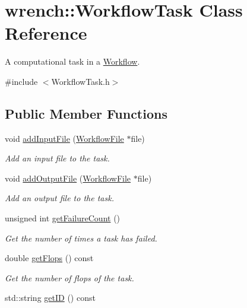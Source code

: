 \hypertarget{classwrench_1_1_workflow_task}{}\section{wrench\+:\+:Workflow\+Task Class Reference}
\label{classwrench_1_1_workflow_task}


A computational task in a \hyperlink{classwrench_1_1_workflow}{Workflow}.  




{\ttfamily \#include $<$Workflow\+Task.\+h$>$}

\subsection*{Public Member Functions}
\begin{DoxyCompactItemize}
\item 
void \hyperlink{classwrench_1_1_workflow_task_a3498047afb74ea6ce2132d44f8c678e8}{add\+Input\+File} (\hyperlink{classwrench_1_1_workflow_file}{Workflow\+File} $\ast$file)
\begin{DoxyCompactList}\small\item\em Add an input file to the task. \end{DoxyCompactList}\item 
void \hyperlink{classwrench_1_1_workflow_task_ac774b4fddc07753f5fc7daa31ae28fd3}{add\+Output\+File} (\hyperlink{classwrench_1_1_workflow_file}{Workflow\+File} $\ast$file)
\begin{DoxyCompactList}\small\item\em Add an output file to the task. \end{DoxyCompactList}\item 
unsigned int \hyperlink{classwrench_1_1_workflow_task_a6103d36486855fb8caabb008bcfaacd4}{get\+Failure\+Count} ()
\begin{DoxyCompactList}\small\item\em Get the number of times a task has failed. \end{DoxyCompactList}\item 
double \hyperlink{classwrench_1_1_workflow_task_aec0aab3ed552960729a60d1d3c4a3de2}{get\+Flops} () const
\begin{DoxyCompactList}\small\item\em Get the number of flops of the task. \end{DoxyCompactList}\item 
std\+::string \hyperlink{classwrench_1_1_workflow_task_a18ce8967b4b59d2d231a1218a8d3b813}{get\+ID} () const

\end{DoxyCompactItemize}
